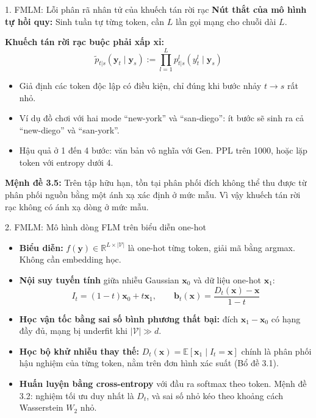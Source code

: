 \begin{frame}{1. FMLM: Lỗi phân rã nhân tử của khuếch tán rời rạc}
    \small
    \textbf{Nút thắt của mô hình tự hồi quy:} Sinh tuần tự từng token, cần $L$ lần gọi mạng cho chuỗi dài $L$.
    \vspace{0.15cm}

    \textbf{Khuếch tán rời rạc buộc phải xấp xỉ:}
    $$\tilde{p}_{t|s}(\mathbf{y}_t \mid \mathbf{y}_s) := \prod_{l=1}^{L} p^{l}_{t|s}(y_t^{l} \mid \mathbf{y}_s)$$
    \begin{itemize}
        \item Giả định các token độc lập có điều kiện, chỉ đúng khi bước nhảy $t \to s$ rất nhỏ.
        \item Ví dụ đồ chơi với hai mode ``new-york'' và ``san-diego'': ít bước sẽ sinh ra cả ``new-diego'' và ``san-york''.
        \item Hậu quả ở 1 đến 4 bước: văn bản vô nghĩa với Gen. PPL trên 1000, hoặc lặp token với entropy dưới 4.
    \end{itemize}
    \vspace{0.15cm}
    \textbf{Mệnh đề 3.5:} Trên tập hữu hạn, tồn tại phân phối đích không thể thu được từ phân phối nguồn bằng một ánh xạ xác định ở mức mẫu. Vì vậy khuếch tán rời rạc không có ánh xạ dòng ở mức mẫu.
\end{frame}

\begin{frame}{2. FMLM: Mô hình dòng FLM trên biểu diễn one-hot}
    \begin{itemize}
        \item \textbf{Biểu diễn:} $f(\mathbf{y}) \in \mathbb{R}^{L \times |\mathcal{V}|}$ là one-hot từng token, giải mã bằng argmax. Không cần embedding học.
        \item \textbf{Nội suy tuyến tính} giữa nhiễu Gaussian $\mathbf{x}_0$ và dữ liệu one-hot $\mathbf{x}_1$:
        $$I_t = (1-t)\mathbf{x}_0 + t\mathbf{x}_1, \qquad \mathbf{b}_t(\mathbf{x}) = \frac{D_t(\mathbf{x}) - \mathbf{x}}{1-t}$$
        \item \textbf{Học vận tốc bằng sai số bình phương thất bại:} đích $\mathbf{x}_1 - \mathbf{x}_0$ có hạng đầy đủ, mạng bị underfit khi $|\mathcal{V}| \gg d$.
        \item \textbf{Học bộ khử nhiễu thay thế:} $D_t(\mathbf{x}) = \mathbb{E}[\mathbf{x}_1 \mid I_t = \mathbf{x}]$ chính là phân phối hậu nghiệm của từng token, nằm trên đơn hình xác suất (Bổ đề 3.1).
        \item \textbf{Huấn luyện bằng cross-entropy} với đầu ra softmax theo token. Mệnh đề 3.2: nghiệm tối ưu duy nhất là $D_t$, và sai số nhỏ kéo theo khoảng cách Wasserstein $W_2$ nhỏ.
    \end{itemize}
\end{frame}

